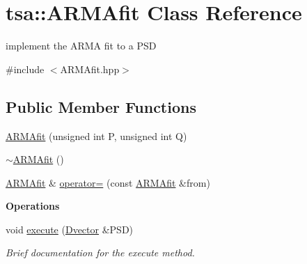 \hypertarget{classtsa_1_1_a_r_m_afit}{}\section{tsa\+:\+:A\+R\+M\+Afit Class Reference}
\label{classtsa_1_1_a_r_m_afit}


implement the A\+R\+MA fit to a P\+SD  




{\ttfamily \#include $<$A\+R\+M\+Afit.\+hpp$>$}

\subsection*{Public Member Functions}
\begin{DoxyCompactItemize}
\item 
\hyperlink{classtsa_1_1_a_r_m_afit_ad55e4fccddc92e18f99276486d281ba8}{A\+R\+M\+Afit} (unsigned int P, unsigned int Q)
\item 
\hyperlink{classtsa_1_1_a_r_m_afit_a3e41abe33c5bdbd657ce48bbe1e21fe8}{$\sim$\+A\+R\+M\+Afit} ()
\item 
\hyperlink{classtsa_1_1_a_r_m_afit}{A\+R\+M\+Afit} \& \hyperlink{classtsa_1_1_a_r_m_afit_a985bddf4c53ff0d8ceef060348baeb8c}{operator=} (const \hyperlink{classtsa_1_1_a_r_m_afit}{A\+R\+M\+Afit} \&from)
\end{DoxyCompactItemize}
\begin{Indent}\textbf{ Operations}\par
\begin{DoxyCompactItemize}
\item 
void \hyperlink{classtsa_1_1_a_r_m_afit_a4ad977172d957bbcfee5a2eeba0ccdec}{execute} (\hyperlink{namespacetsa_a8900fb03d849baf447a1a0efe2561fb2}{Dvector} \&P\+SD)
\begin{DoxyCompactList}\small\item\em Brief documentation for the execute method. \end{DoxyCompactList}\end{DoxyCompactItemize}
\end{Indent}
